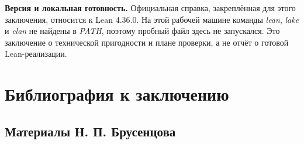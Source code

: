\documentclass[12pt,a4paper]{article}
\begin{document}
\textbf{Версия и локальная готовность.} Официальная справка, закреплённая для этого заключения, относится к Lean 4.36.0. На этой рабочей машине команды \emph{lean}, \emph{lake} и \emph{elan} не найдены в \emph{PATH}, поэтому пробный файл здесь не запускался. Это заключение о технической пригодности и плане проверки, а не отчёт о готовой Lean-реализации.

\section{Библиография к заключению}

\subsection{Материалы Н. П. Брусенцова}
\end{document}

